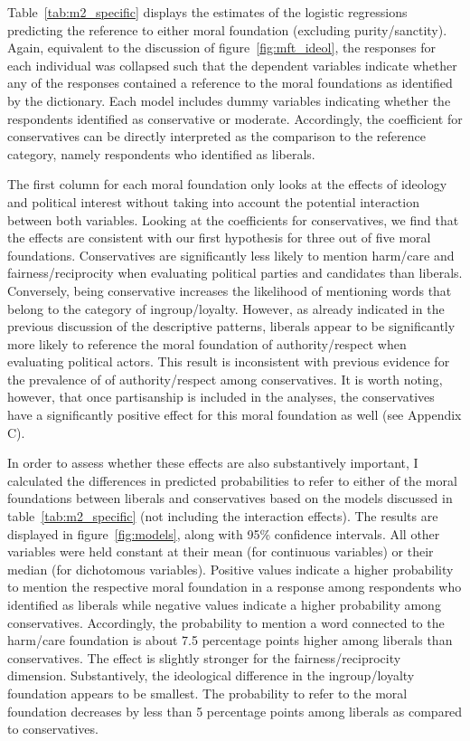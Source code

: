 \documentclass[12pt]{article}
\begin{document}
Table~\ref{tab:m2_specific} displays the estimates of the logistic regressions predicting the reference to either moral foundation (excluding purity/sanctity). Again, equivalent to the discussion of figure~\ref{fig:mft_ideol}, the responses for each individual was collapsed such that the dependent variables indicate whether any of the responses contained a reference to the moral foundations as identified by the dictionary. Each model includes dummy variables indicating whether the respondents identified as conservative or moderate. Accordingly, the coefficient for conservatives can be directly interpreted as the comparison to the reference category, namely respondents who identified as liberals.


The first column for each moral foundation only looks at the effects of ideology and political interest without taking into account the potential interaction between both variables. Looking at the coefficients for conservatives, we find that the effects are consistent with our first hypothesis for three out of five moral foundations. Conservatives are significantly less likely to mention harm/care and fairness/reciprocity when evaluating political parties and candidates than liberals. Conversely, being conservative increases the likelihood of mentioning words that belong to the category of ingroup/loyalty. However, as already indicated in the previous discussion of the descriptive patterns, liberals appear to be significantly more likely to reference the moral foundation of authority/respect when evaluating political actors. This result is inconsistent with previous evidence for the prevalence of of authority/respect among conservatives. It is worth noting, however, that once partisanship is included in the analyses, the conservatives have a significantly positive effect for this moral foundation as well (see Appendix C).

In order to assess whether these effects are also substantively important, I calculated the differences in predicted probabilities to refer to either of the moral foundations between liberals and conservatives based on the models discussed in table~\ref{tab:m2_specific} (not including the interaction effects). The results are displayed in figure~\ref{fig:models}, along with 95\% confidence intervals. All other variables were held constant at their mean (for continuous variables) or their median (for dichotomous variables). Positive values indicate a higher probability to mention the respective moral foundation in a response among respondents who identified as liberals while negative values indicate a higher probability among conservatives. Accordingly, the probability to mention a word connected to the harm/care foundation is about 7.5 percentage points higher among liberals than conservatives. The effect is slightly stronger for the fairness/reciprocity dimension. Substantively, the ideological difference in the ingroup/loyalty foundation appears to be smallest. The probability to refer to the moral foundation decreases by less than 5 percentage points among liberals as compared to conservatives.
\end{document}
